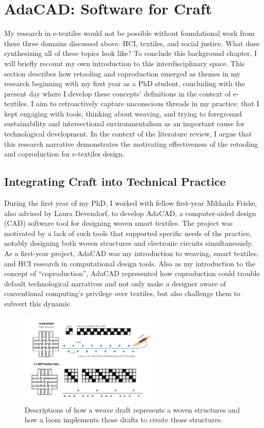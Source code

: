 \section{AdaCAD: Software for Craft}
\label{ch_adacad}

My research in e-textiles would not be possible without foundational work from these three domains discussed above: HCI, textiles, and social justice. What does synthesizing all of these topics look like? To conclude this background chapter, I will briefly recount my own introduction to this interdisciplinary space. This section describes how retooling and coproduction emerged as themes in my research beginning with my first year as a PhD student, concluding with the present day where I develop these concepts' definitions in the context of e-textiles. I aim to retroactively capture unconscious threads in my practice: that I kept engaging with tools, thinking about weaving, and trying to foreground sustainability and intersectional environmentalism as an important cause for technological development. In the context of the literature review, I argue that this research narrative demonstrates the motivating effectiveness of the retooling and coproduction for e-textiles design.

\subsection{Integrating Craft into Technical Practice }

During the first year of my PhD, I worked with fellow first-year Mikhaila Friske, also advised by Laura Devendorf, to develop AdaCAD, a computer-aided design (CAD) software tool for designing woven smart textiles. The project was motivated by a lack of such tools that supported specific needs of the practice, notably designing both woven structures and electronic circuits simultaneously. As a first-year project, AdaCAD was my introduction to weaving, smart textiles, and HCI research in computational design tools. Also as my introduction to the concept of ``coproduction'', AdaCAD represented how coproduction could trouble default technological narratives and not only make a designer aware of conventional computing's privilege over textiles, but also challenge them to subvert this dynamic.

\begin{figure}
  \includegraphics[width=0.6\textwidth]{figs/AdaCAD_weavedrafts_300.jpg}
  \caption[Examples of weaving draft notation.]{Descriptions of how a weave draft represents a woven structures and how a loom implements those drafts to create those structures.
  }
  \label{fig:adacad-drafts}
\end{figure}

